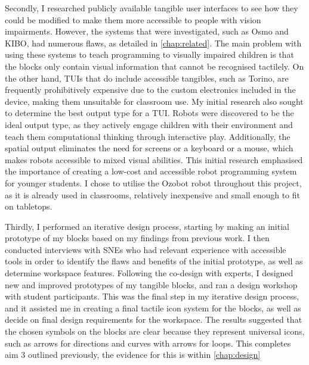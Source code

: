 \documentclass[oneside,%
                    author={Malak Hajji},
                    degree={BSc},
                    title={Designing An Accessible Ozobot Programming Platform for Students},
                  subtitle={With Mixed Visual Abilities}]{dissertation}
\begin{document}
Secondly, I researched publicly available tangible user interfaces to see how they could be modified to make them more accessible to people with vision impairments. However, the systems that were investigated, such as Osmo and KIBO, had numerous flaws, as detailed in \ref{chap:related}. The main problem with using these systems to teach programming to visually impaired children is that the blocks only contain visual information that cannot be recognised tactilely. On the other hand, TUIs that do include accessible tangibles, such as Torino, are frequently prohibitively expensive due to the custom electronics included in the device, making them unsuitable for classroom use. My initial research also sought to determine the best output type for a TUI. Robots were discovered to be the ideal output type, as they actively engage children with their environment and teach them computational thinking through interactive play. Additionally, the spatial output eliminates the need for screens or a keyboard or a mouse, which makes robots accessible to mixed visual abilities. This initial research emphasised the importance of creating a low-cost and accessible robot programming system for younger students. I chose to utilise the Ozobot robot throughout this project, as it is already used in classrooms, relatively inexpensive and small enough to fit on tabletops.

Thirdly, I performed an iterative design process, starting by making an initial prototype of my blocks based on my findings from previous work. I then conducted interviews with SNEs who had relevant experience with accessible tools in order to identify the flaws and benefits of the initial prototype, as well as determine workspace features. Following the co-design with experts, I designed new and improved prototypes of my tangible blocks, and ran a design workshop with student participants. This was the final step in my iterative design process, and it assisted me in creating a final tactile icon system for the blocks, as well as decide on final design requirements for the workspace. The results suggested that the chosen symbols on the blocks are clear because they represent universal icons, such as arrows for directions and curves with arrows for loops. This completes aim 3 outlined previously, the evidence for this is within \ref{chap:design}
\end{document}
